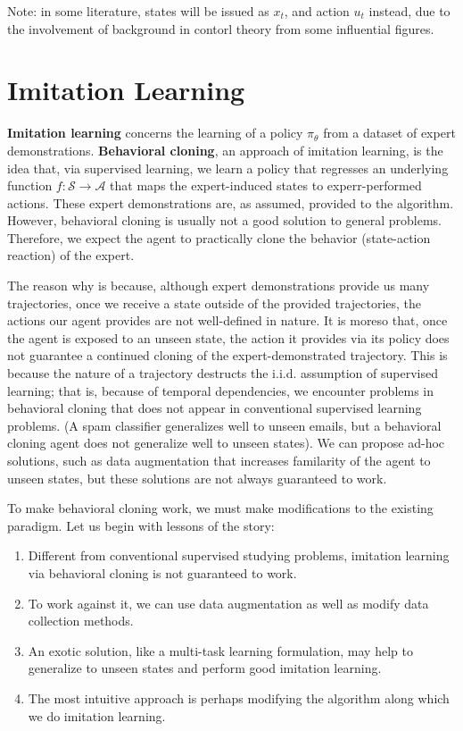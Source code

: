 Note: in some literature, states will be issued as $x_t$, and action $u_t$ instead, due to the involvement of background in contorl theory from some influential figures.

\section{Imitation Learning}
\textbf{Imitation learning} concerns the learning of a policy $\pi_\theta$ from a dataset of expert demonstrations.
\textbf{Behavioral cloning}, an approach of imitation learning, is the idea that, via supervised learning, we learn a policy that regresses an underlying function $f: \mathcal{S} \rightarrow \mathcal{A}$ that maps the expert-induced states to experr-performed actions.
These expert demonstrations are, as assumed, provided to the algorithm.
However, behavioral cloning is usually not a good solution to general problems.
Therefore, we expect the agent to practically clone the behavior (state-action reaction) of the expert.

The reason why is because, although expert demonstrations provide us many trajectories, once we receive a state outside of the provided trajectories, the actions our agent provides are not well-defined in nature.
It is moreso that, once the agent is exposed to an unseen state, the action it provides via its policy does not guarantee a continued cloning of the expert-demonstrated trajectory.
This is because the nature of a trajectory destructs the i.i.d. assumption of supervised learning; that is, because of temporal dependencies, we encounter problems in behavioral cloning that does not appear in conventional supervised learning problems.
(A spam classifier generalizes well to unseen emails, but a behavioral cloning agent does not generalize well to unseen states).
We can propose ad-hoc solutions, such as data augmentation that increases familarity of the agent to unseen states, but these solutions are not always guaranteed to work.

To make behavioral cloning work, we must make modifications to the existing paradigm.
Let us begin with lessons of the story:
\begin{enumerate}
    \item Different from conventional supervised studying problems, imitation learning via behavioral cloning is not guaranteed to work.
    \item To work against it, we can use data augmentation as well as modify data collection methods.
    \item An exotic solution, like a multi-task learning formulation, may help to generalize to unseen states and perform good imitation learning.
    \item The most intuitive approach is perhaps modifying the algorithm along which we do imitation learning.
\end{enumerate}

